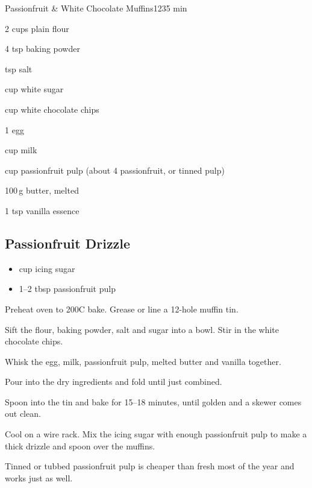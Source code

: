 \begin{recipebox}{Passionfruit \& White Chocolate Muffins}{12}{35 min}
\begin{ingredients}
  \item 2 cups plain flour
  \item 4 tsp baking powder
  \item {} tsp salt
  \item {} cup white sugar
  \item {} cup white chocolate chips
  \item 1 egg
  \item {} cup milk
  \item {} cup passionfruit pulp (about 4 passionfruit, or tinned pulp)
  \item 100\,g butter, melted
  \item 1 tsp vanilla essence
\end{ingredients}

\subsection*{Passionfruit Drizzle}
\begin{itemize}[leftmargin=2em]
  \item {} cup icing sugar
  \item 1--2 tbsp passionfruit pulp
\end{itemize}

\begin{method}
  \item Preheat oven to 200\degree C bake. Grease or line a 12-hole muffin tin.
  \item Sift the flour, baking powder, salt and sugar into a bowl. Stir in the white chocolate chips.
  \item Whisk the egg, milk, passionfruit pulp, melted butter and vanilla together.
  \item Pour into the dry ingredients and fold until just combined.
  \item Spoon into the tin and bake for 15--18 minutes, until golden and a skewer comes out clean.
  \item Cool on a wire rack. Mix the icing sugar with enough passionfruit pulp to make a thick drizzle and spoon over the muffins.
\end{method}

\begin{notes}
Tinned or tubbed passionfruit pulp is cheaper than fresh most of the year and works just as well.
\end{notes}
\end{recipebox}
